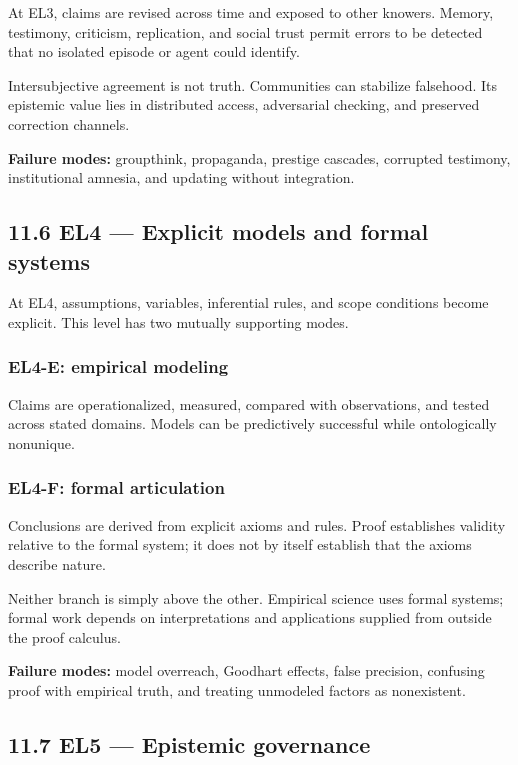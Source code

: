 \documentclass[
  11pt,
]{article}
\begin{document}
At EL3, claims are revised across time and exposed to other knowers.
Memory, testimony, criticism, replication, and social trust permit
errors to be detected that no isolated episode or agent could identify.

Intersubjective agreement is not truth. Communities can stabilize
falsehood. Its epistemic value lies in distributed access, adversarial
checking, and preserved correction channels.

\textbf{Failure modes:} groupthink, propaganda, prestige cascades,
corrupted testimony, institutional amnesia, and updating without
integration.

\subsection{11.6 EL4 --- Explicit models and formal
systems}\label{el4-explicit-models-and-formal-systems}

At EL4, assumptions, variables, inferential rules, and scope conditions
become explicit. This level has two mutually supporting modes.

\subsubsection{EL4-E: empirical
modeling}\label{el4-e-empirical-modeling}

Claims are operationalized, measured, compared with observations, and
tested across stated domains. Models can be predictively successful
while ontologically nonunique.

\subsubsection{EL4-F: formal
articulation}\label{el4-f-formal-articulation}

Conclusions are derived from explicit axioms and rules. Proof
establishes validity relative to the formal system; it does not by
itself establish that the axioms describe nature.

Neither branch is simply above the other. Empirical science uses formal
systems; formal work depends on interpretations and applications
supplied from outside the proof calculus.

\textbf{Failure modes:} model overreach, Goodhart effects, false
precision, confusing proof with empirical truth, and treating unmodeled
factors as nonexistent.

\subsection{11.7 EL5 --- Epistemic
governance}\label{el5-epistemic-governance}
\end{document}
